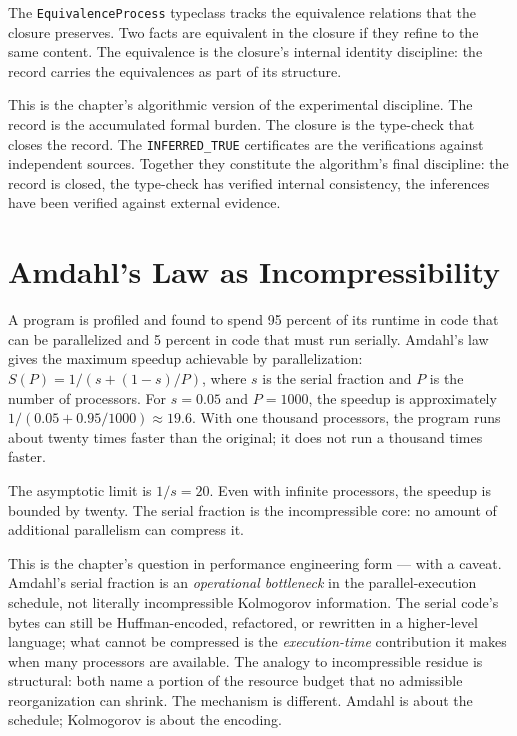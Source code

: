 The \texttt{EquivalenceProcess} typeclass tracks the equivalence
relations that the closure preserves. Two facts are equivalent
in the closure if they refine to the same content. The
equivalence is the closure's internal identity discipline: the
record carries the equivalences as part of its structure.

This is the chapter's algorithmic version of the experimental
discipline. The record is the accumulated formal burden. The
closure is the type-check that closes the record. The
\texttt{INFERRED\_TRUE} certificates are the verifications
against independent sources. Together they constitute the
algorithm's final discipline: the record is closed, the
type-check has verified internal consistency, the inferences
have been verified against external evidence.

\section{Amdahl's Law as Incompressibility}
\label{se:amdahls-law-as-incompressibility}

A program is profiled and found to spend 95 percent of its runtime
in code that can be parallelized and 5 percent in code that must
run serially. Amdahl's law gives the maximum speedup achievable by
parallelization: $S(P) = 1 / (s + (1-s)/P)$, where $s$ is the
serial fraction and $P$ is the number of processors. For $s = 0.05$
and $P = 1000$, the speedup is approximately $1 / (0.05 +
0.95/1000) \approx 19.6$. With one thousand processors, the program
runs about twenty times faster than the original; it does not run a
thousand times faster.

The asymptotic limit is $1/s = 20$. Even with infinite processors,
the speedup is bounded by twenty. The serial fraction is the
incompressible core: no amount of additional parallelism can
compress it.

This is the chapter's question in performance engineering form ---
with a caveat. Amdahl's serial fraction is an
\emph{operational bottleneck} in the parallel-execution schedule,
not literally incompressible Kolmogorov information. The serial
code's bytes can still be Huffman-encoded, refactored, or rewritten
in a higher-level language; what cannot be compressed is the
\emph{execution-time} contribution it makes when many processors
are available. The analogy to incompressible residue is structural:
both name a portion of the resource budget that no admissible
reorganization can shrink. The mechanism is different. Amdahl is
about the schedule; Kolmogorov is about the encoding.

